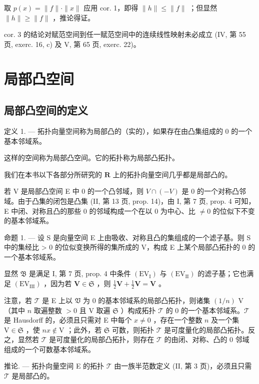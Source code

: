 取 \(p(x) = \| f \| \cdot \| x \|\) 应用 cor. 1，即得 \(\| h \| \leqslant \| f \|\) ；但显然 \(\| h \| \geqslant \| f \|\) ，推论得证。

cor. 3 的结论对赋范空间到任一赋范空间中的连续线性映射未必成立 (IV, 第 55 页, exerc. 16, c) 及 V, 第 65 页, exerc. 22)。

\section{局部凸空间}

\subsection{局部凸空间的定义}

定义 1. --- 拓扑向量空间称为局部凸的（实的），如果存在由凸集组成的 0 的一个基本邻域系。

这样的空间称为局部凸空间。它的拓扑称为局部凸拓扑。

我们在本书以下各部分所研究的 \(\mathbf{R}\) 上的拓扑向量空间几乎都是局部凸的。

若 V 是局部凸空间 E 中 0 的一个凸邻域，则 \(V \cap (-V)\) 是 0 的一个对称凸邻域。由于凸集的闭包是凸集 (II, 第 13 页, prop. 14)，由 I, 第 7 页, prop. 4 可知，E 中闭、对称且凸的那些 0 的邻域构成一个在以 0 为中心、比 \(\neq 0\) 的位似下不变的基本邻域系。

命题 1. --- 设 S 是向量空间 E 上由吸收、对称且凸的集组成的一个滤子基。则 S 中的集经比 \textgreater{} 0 的位似变换所得的集所成的 V，构成 E 上某个局部凸拓扑的 0 的一个基本邻域系。

显然 \(\mathfrak{B}\) 是满足 I, 第 7 页, prop. 4 中条件 \((\mathrm{EV}_{\mathrm{I}})\) 与 \((\mathrm{EV}_{\mathrm{II}})\) 的滤子基；它也满足 \((\mathrm{EV}_{\mathrm{III}})\) ，因为若 \(\mathbf{V} \in \mathfrak{S}\) ，则 \(\frac{1}{2}\mathbf{V} + \frac{1}{2}\mathbf{V} = \mathbf{V}\) 。

注意，若 \(\mathcal{T}\) 是 E 上以 \(\mathfrak{V}\) 为 0 的基本邻域系的局部凸拓扑，则诸集 \((1/n)\) V（其中 \(n\) 取遍整数 \(>0\) 且 V 取遍 \(\mathfrak{S}\) ）构成拓扑 \(\mathcal{T}\) 的 0 的一个基本邻域系。\(\mathcal{T}\) 是 Hausdorff 的，必须且只需对 E 中每个 \(x \neq 0\) ，存在一个整数 \(n\) 及一个集 \(\mathrm{V} \in \mathfrak{S}\) ，使 \(nx \notin \mathrm{V}\) ；此外，若 \(\mathfrak{S}\) 可数，则拓扑 \(\mathcal{T}\) 是可度量化的局部凸拓扑。反之，显然若 \(\mathcal{T}\) 是可度量化的局部凸拓扑，则存在 \(\mathcal{T}\) 的由闭、对称、凸的 0 邻域组成的一个可数基本邻域系。

推论. --- 拓扑向量空间 E 的拓扑 \(\mathcal{T}\) 由一族半范数定义 (II, 第 3 页)，必须且只需 \(\mathcal{T}\) 是局部凸的。

